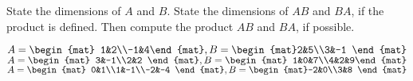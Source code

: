 
\begin{Exercise}[
name={},
title={}, 
difficulty=0,
origin={\cite{GH}}]
State the dimensions of $A$ and $B$. State the dimensions of $AB$ and $BA$, if the product is defined. Then compute the product $AB$ and $BA$, if possible.
\begin{multicols}{2}
\Question $A=\begin{mat}  1&2\\-1&4\end{mat}, \\ B=\begin{mat}2&5\\3&-1 \end{mat}$
\Question $A=\begin{mat} 3&-1\\2&2 \end{mat}, \\ B=\begin{mat} 1&0&7\\4&2&9\end{mat}$
\Question $A=\begin{mat} 0&1\\1&-1\\-2&-4 \end{mat}, \\ B=\begin{mat}-2&0\\3&8 \end{mat}$

\end{multicols}
\end{Exercise}
